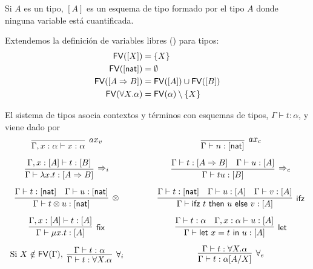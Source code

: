 \documentclass[twoside,a4paper,12pt]{article}
\theoremstyle{definition}
\theoremstyle{remark}
\begin{document}
Si $A$ es un tipo, $[A]$ es un esquema de tipo formado por el tipo $A$ donde
ninguna variable está cuantificada.

\begin{definicion}{6.3}
  Extendemos la definición de variables libres (\FV) para tipos:
  \begin{align*}
    \mathsf{FV}([X]) & = \{X\}\\
    \mathsf{FV}([\mathsf{nat}]) & = \emptyset\\
    \mathsf{FV}([A\Rightarrow B]) & = \mathsf{FV}([A])\cup\mathsf{FV}([B])\\
    \mathsf{FV}(\forall X.\alpha) & = \mathsf{FV}(\alpha)\setminus\{X\}
  \end{align*}
\end{definicion}

\begin{definicion}
  El sistema de tipos asocia contextos y términos con esquemas de tipos,
  $\Gamma\vdash t:\alpha$, y viene dado por
  \[
    \begin{array}{c@{\qquad\qquad}c}
      \infer[ax_v]{\Gamma,x:\alpha\vdash x:\alpha}{}
      &
        \infer[ax_c]{\Gamma\vdash n:[\nat]}{}
      \\[2ex]
      \infer[\Rightarrow_i]{\Gamma\vdash\fun xt:[A\Rightarrow B]}
      {\Gamma,x:[A]\vdash t:[B]}
      &
        \infer[\Rightarrow_e]{\Gamma\vdash tu:[B]}
        {
        \Gamma\vdash t:[A\Rightarrow B]
      &
        \Gamma\vdash u:[A]
        }
      \\[2ex]
      \infer[\otimes]{\Gamma\vdash t\otimes u:[\nat]}
      {\Gamma\vdash t:[\nat] & \Gamma\vdash u:[\nat]}
      &
        \infer[\mathsf{ifz}]{\Gamma\vdash\ifz tuv:[A]}
        {\Gamma\vdash t:[\nat] & \Gamma\vdash u:[A] & \Gamma\vdash v:[A]}
      \\[2ex]
      \infer[\mathsf{fix}]{\Gamma\vdash\fix xt:[A]}{\Gamma,x:[A]\vdash t:[A]}
      &
        \infer[\mathsf{let}]{\Gamma\vdash\letl xtu:[A]}
        {\Gamma\vdash t:\alpha & \Gamma,x:\alpha\vdash u:[A]}
      \\[2ex]
      \textrm{Si }X\notin\FV(\Gamma),\ \vcenter{\infer[\forall_i]{\Gamma\vdash t:\forall X.\alpha}{\Gamma\vdash t:\alpha}}
      &
        \vcenter{\infer[\forall_e]{\Gamma\vdash t:\alpha[A/X]}{\Gamma\vdash t:\forall X.\alpha}}
    \end{array}
  \]
\end{definicion}
\end{document}
